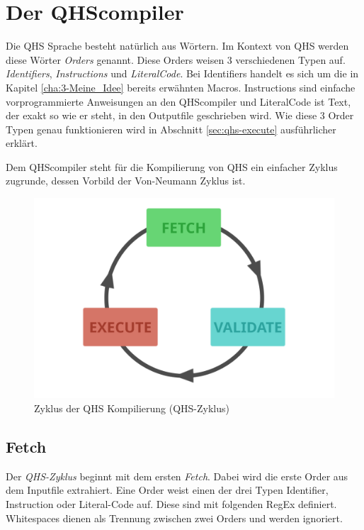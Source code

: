 \chapter{Der QHScompiler} \label{cha:4-QHS_Compiler}
Die QHS Sprache besteht natürlich aus Wörtern. Im Kontext von QHS werden diese Wörter \textit{Orders} genannt. Diese Orders weisen 3 verschiedenen Typen auf. \textit{Identifiers}, \textit{Instructions} und \textit{LiteralCode}.
Bei Identifiers handelt es sich um die in Kapitel \ref{cha:3-Meine_Idee} bereits erwähnten Macros. Instructions sind einfache vorprogrammierte Anweisungen an den QHScompiler und LiteralCode ist Text, der exakt so wie er steht,
in den Outputfile geschrieben wird. Wie diese 3 Order Typen genau funktionieren wird in Abschnitt \ref{sec:qhs-execute} ausführlicher erklärt.

Dem QHScompiler steht für die Kompilierung von QHS ein einfacher Zyklus zugrunde, dessen Vorbild der Von-Neumann Zyklus ist.

\begin{figure}[h!]
    \centering
    \includegraphics[scale=0.6]{resources/images/qhs-cycle.png}
    \caption{Zyklus der QHS Kompilierung (QHS-Zyklus)}
    \label{fig:qhs-cycle}
\end{figure}

\section{Fetch} \label{sec:qhs-fetch}
Der \textit{QHS-Zyklus} beginnt mit dem ersten \textit{Fetch}. Dabei wird die erste Order aus dem Inputfile extrahiert. Eine Order weist einen der drei Typen Identifier, Instruction oder Literal-Code auf.
Diese sind mit folgenden RegEx definiert. Whitespaces dienen als Trennung zwischen zwei Orders und werden ignoriert.

